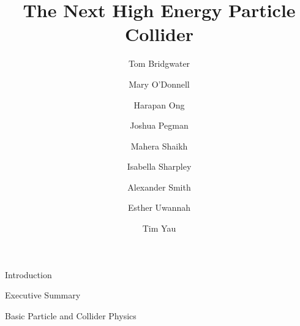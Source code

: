 \documentclass[12pt]{article}
\begin{document}
 

    \begin{titlepage}
    
     \author{
         Tom Bridgwater \and
         Mary O'Donnell \and
         Harapan Ong \and
         Joshua Pegman \and
         Mahera Shaikh \and
         Isabella Sharpley \and
         Alexander Smith \and
         Esther Uwannah \and
         Tim Yau
     }
     
     \title{The Next High Energy Particle Collider}
     
     \maketitle
     \thispagestyle{empty}
     
    
    \end{titlepage}
 
 \clearpage
 
 
 
 \clearpage
 
 \setcounter{tocdepth}{2}
 \tableofcontents 
 
 \clearpage
 
 \begin{section}{Introduction}
     
 \end{section}
 
 \begin{section}{Executive Summary}
 	 
 \end{section}

 \begin{section}{Basic Particle and Collider Physics}
     
     
 \end{section}
 
\end{document}

